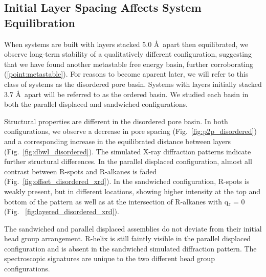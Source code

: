 \documentclass{article}
\newcommand{\angstrom}{\textup{\AA}}
\begin{document}
  \subsection{Initial Layer Spacing Affects System Equilibration}

  When systems are built with layers stacked 5.0 \AA~apart then equilibrated,
  we observe long-term stability of a qualitatively different configuration,
  suggesting that we have found another metastable free energy basin, further
  corroborating (\ref{point:metastable}). For reasons to become aparent later,
  we will refer to this class of systems as the disordered pore basin. 
  Systems with layers initially stacked 3.7 \AA~apart will be referred to
  as the ordered basin. We studied each basin in both the parallel
  displaced and sandwiched configurations. 

  Structural properties are different in the disordered pore basin.  In both
  configurations, we observe a decrease in pore spacing
  (Fig.~\ref{fig:p2p_disordered}) and a corresponding increase in the
  equilibrated distance between layers (Fig.~\ref{fig:dbwl_disordered}). The
  simulated X-ray diffraction patterns indicate further structural differences.
  In the parallel displaced configuration, almost all contrast between R-spots
  and R-alkanes is faded (Fig.~\ref{fig:offset_disordered_xrd}). In the
  sandwiched configuration, R-spots is weakly present, but in different
  locations, showing higher intensity at the top and bottom of the pattern as
  well as at the intersection of R-alkanes with q$_z$ = 0 (Fig.
  ~\ref{fig:layered_disordered_xrd}). 

  The sandwiched and parallel displaced assemblies do not deviate from their
  initial head group arrangement. R-helix is still faintly visible in the
  parallel displaced configuration and is absent in the sandwiched simulated
  diffraction pattern. The spectroscopic signatures are unique to the two
  different head group configurations.
\end{document}
